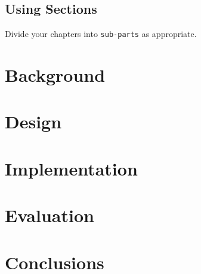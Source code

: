 \documentclass[bsc,frontabs,twoside,singlespacing,parskip,deptreport]{infthesis}
\begin{document}




\section{Using Sections}

Divide your chapters into {\tt sub-parts} as appropriate.

\chapter{Background}
\chapter{Design}
\chapter{Implementation}


\chapter{Evaluation}

\chapter{Conclusions}



\end{document}
